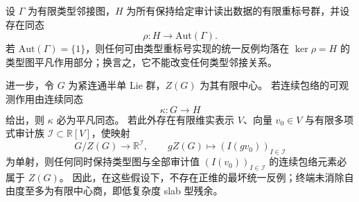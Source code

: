 \begin{proposition}[统一反例的类型图核归约]\label{prop:distill-group-unification-counterexample-kernel}
设 \(\Gamma\) 为有限类型邻接图，\(H\) 为所有保持给定审计读出数据的有限重标号群，并设存在同态
\[
\rho:H\longrightarrow \mathrm{Aut}(\Gamma).
\]
若 \(\mathrm{Aut}(\Gamma)=\{1\}\)，则任何可由类型重标号实现的统一反例均落在 \(\ker\rho=H\) 的类型图平凡作用部分；换言之，它不能改变任何类型邻接关系。

进一步，令 \(G\) 为紧连通半单 Lie 群，\(Z(G)\) 为其有限中心。
若连续包络的可观测作用由连续同态
\[
\kappa:G\longrightarrow H
\]
给出，则 \(\kappa\) 必为平凡同态。
若此外存在有限维实表示 \(V\)、向量 \(v_0\in V\) 与有限多项式审计族 \(\mathcal I\subset\mathbb R[V]\)，使映射
\[
G/Z(G)\longrightarrow \mathbb R^{\mathcal I},\qquad
 gZ(G)\longmapsto (I(gv_0))_{I\in\mathcal I}
\]
为单射，则任何同时保持类型图与全部审计值 \((I(v_0))_{I\in\mathcal I}\) 的连续包络元素必属于 \(Z(G)\)。
因此，在这些假设下，不存在正维的最坏统一反例；终端未消除自由度至多为有限中心商，即低复杂度 slab 型残余。
\end{proposition}
